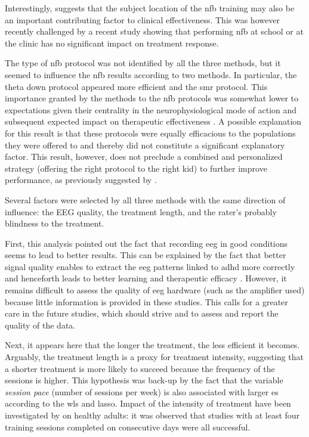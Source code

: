 Interestingly, \citep{Minder2018} suggests that the subject location of the \gls{nfb} training may also be an important contributing 
factor to clinical effectiveness. This was however recently challenged by a recent study \citep{Minder2018} showing that 
performing \gls{nfb} at school or at the clinic has no significant impact on treatment response. 

The type of \gls{nfb} protocol was not identified by all the three methods, but it seemed to influence the \gls{nfb} results
according to two methods. In particular, the theta down protocol appeared more efficient and the \gls{smr} protocol. 
This importance granted by the methods to the \gls{nfb} protocols was somewhat lower to
expectations given their centrality in the neurophysiological mode of action and subsequent expected impact on
therapeutic effectiveness \citep{Vernon2004}. A possible explanation for this result is that these protocols were equally 
efficacious to the populations they were offered to and thereby did not constitute a significant explanatory factor. 
This result, however, does not preclude a combined and personalized strategy (offering the right protocol to the right kid) 
to further improve performance, as previously suggested by \citet{Alkoby2017}.

Several factors were selected by all three methods with the same direction of influence: the EEG quality, the treatment 
length, and the rater's probably blindness to the treatment.

First, this analysis pointed out the fact that recording \gls{eeg} in good conditions seems to lead to better results.
This can be explained by the fact that better signal quality enables to extract the \gls{eeg} patterns
linked to \gls{adhd} more correctly and henceforth leads to better learning and therapeutic efficacy \citep{Congedo2004}. 
However, it remains difficult to assess the quality of \gls{eeg} hardware (such as the amplifier used) 
because little information is provided in these studies.  
This calls for a greater care in the future studies, which should strive and to assess and report the quality of the data.

Next, it appears here that the longer the treatment, the less efficient it becomes. Arguably, the treatment length is a
proxy for treatment intensity, suggesting that a shorter treatment is more likely to succeed because the frequency of the sessions
is higher. This hypothesis was back-up by the fact that the variable \emph{session pace} (number of
sessions per week) is also associated with larger \gls{es} according to the \gls{wls} and \gls{lasso}. Impact of the
intensity of treatment have been investigated by \citep{Rogala2016} on healthy adults: it was observed that studies with
at least four training sessions completed on consecutive days were all successful. 


